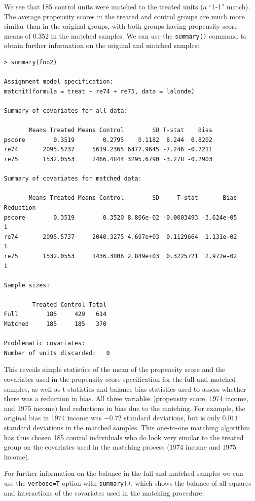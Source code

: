 \documentclass[oneside,letterpaper,titlepage]{article}
\begin{document}
We see that 185 control units were matched to the treated units (a
``1-1'' match).  The average propensity scores in the treated and
control groups are much more similar than in the original groups, with
both groups having propensity score means of $0.352$ in the matched
samples.  We can use the {\tt summary()} command to obtain further
information on the original and matched samples:

\begin{verbatim}
> summary(foo2)
 
Assignment model specification:
matchit(formula = treat ~ re74 + re75, data = lalonde)
 
Summary of covariates for all data:
 
       Means Treated Means Control        SD T-stat    Bias
pscore        0.3519        0.2795    0.1182  8.244  0.8202
re74       2095.5737     5619.2365 6477.9645 -7.246 -0.7211
re75       1532.0553     2466.4844 3295.6790 -3.278 -0.2903
 
Summary of covariates for matched data:
 
       Means Treated Means Control        SD     T-stat       Bias Reduction
pscore        0.3519        0.3520 8.806e-02 -0.0003493 -3.624e-05         1
re74       2095.5737     2040.3275 4.697e+03  0.1129664  1.131e-02         1
re75       1532.0553     1436.3806 2.849e+03  0.3225721  2.972e-02         1
 
Sample sizes:
 
        Treated Control Total
Full        185     429   614
Matched     185     185   370
 
Problematic covariates:
Number of units discarded:   0
\end{verbatim}

This reveals simple statistics of the mean of the propensity score and
the covariates used in the propensity score specification for the full
and matched samples, as well as t-statistics and balance bias
statistics used to assess whether there was a reduction in bias.  All
three variables (propensity score, 1974 income, and 1975 income) had
reductions in bias due to the matching.  For example, the original
bias in 1974 income was $-0.72$ standard deviations, but is only
$0.011$ standard deviations in the matched samples.  This one-to-one
matching algorithm has thus chosen 185 control individuals who do look
very similar to the treated group on the covariates used in the
matching process (1974 income and 1975 income).

For further information on the balance in the full and matched samples
we can use the {\tt verbose=T} option with {\tt summary()}, which
shows the balance of all squares and interactions of the covariates
used in the matching procedure:
\end{document}
